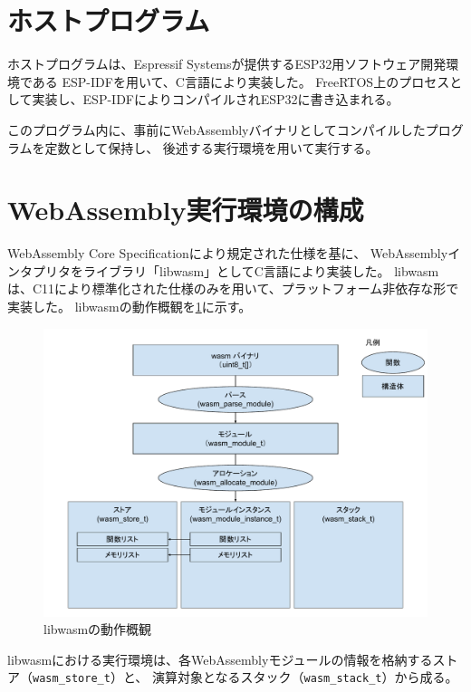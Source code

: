 \section{ホストプログラム}

ホストプログラムは、Espressif Systemsが提供するESP32用ソフトウェア開発環境である
ESP-IDF\cite{esp_idf}を用いて、C言語により実装した。
FreeRTOS上のプロセスとして実装し、ESP-IDFによりコンパイルされESP32に書き込まれる。

このプログラム内に、事前にWebAssemblyバイナリとしてコンパイルしたプログラムを定数として保持し、
後述する実行環境を用いて実行する。

\section{WebAssembly実行環境の構成}

WebAssembly Core Specification\cite{wasm_spec}により規定された仕様を基に、
WebAssemblyインタプリタをライブラリ「libwasm」としてC言語により実装した。
libwasmは、C11により標準化された仕様のみを用いて、プラットフォーム非依存な形で実装した。
libwasmの動作概観を\ref{fig:libwasm_arch}に示す。

\begin{figure}[htbp]
  \caption{libwasmの動作概観}
  \label{fig:libwasm_arch}
  \begin{center}
    \includegraphics[bb=0 0 960 720,width=12cm]{img/libwasm_arch.pdf}
  \end{center}
\end{figure}

libwasmにおける実行環境は、各WebAssemblyモジュールの情報を格納するストア（\verb|wasm_store_t|）と、
演算対象となるスタック（\verb|wasm_stack_t|）から成る。

